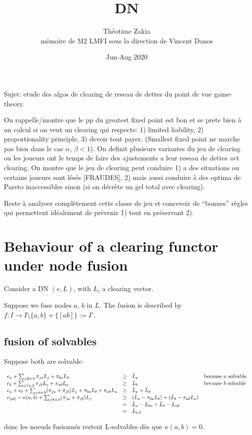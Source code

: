 \documentclass{article}
\title{DN}
\author
{
Théotime Zakia
\\ 
mémoire de M2 LMFI sous la direction de Vincent Danos
}
\date{Jun-Aug 2020}
\def\AR#1{
\[
\begin{array}{llllllll}
#1
\end{array}
\]
}
\begin{document}
\maketitle

Sujet: etude des algos de clearing de reseau de dettes du point de vue game-theory.

On rappelle/montre que le pp du greatest fixed point est bon et se prete bien à un calcul si on veut un clearing qui respecte:
1) limited liability, 
2) proportionality principle, 
3) devoir tout payer. 
(Smallest fixed point ne marche pas bien dans le cas 
$\alpha$, 
$\beta <1$). 
On definit plusieurs variantes du jeu de clearing ou les joueurs ont le temps de faire des ajustements a leur reseau de dettes avt clearing. On montre que le jeu de
clearing peut conduire 1) a des situations ou certains joueurs sont lésés [FRAUDES], 2) mais aussi conduire à des optima de Pareto inaccessibles sinon (si on décrète un gel total avec clearing).

Reste à analyser complètement cette classe de jeu et concevoir de ``bonnes'' règles qui permettent idéalement de prévenir 1) tout en préservant 2). 

\section{
Behaviour of a clearing functor
under node fusion}

Consider a DN $(e,L)$, with $L_i$
a clearing vector.


Suppose we fuse nodes $a$, $b$ in $L$.
The fusion is described by
$f: I \to I\setminus\{a,b\}+\{[ab]\}:=I'$.


\subsection{fusion of solvables} 
Suppose both are solvable:
\AR{
e_a +
\sum_{j\neq a,b} \pi_{ja} L_j
+ \pi_{ba} L_b
&\geq&
\bar L_{a}
&
\hbox{because $a$ solvable}
\\
e_b +
\sum_{j\neq a,b} \pi_{jb} L_j
+ \pi_{ab} L_a
&\geq&
\bar L_{b}
&
\hbox{because $b$ solvable}
\\
e_a + e_b +
\sum_{j\neq a,b} (\pi_{ja}+\pi_{jb}) L_j
+ \pi_{ba} L_b
+ \pi_{ab} L_a
&\geq&
\bar L_{a}
+\bar L_{b}
\\
e_{[ab]} - \kappa(a,b) +
\sum_{j\neq a,b} (\pi_{ja}+\pi_{jb}) L_j
&\geq&
(\bar L_{a} - \pi_{ba} L_b)
+
(\bar L_{b} - \pi_{ab} L_a)
\\
&=&
\bar L_{a} - L_{ba}
+
\bar L_{b} - L_{ab}
\\
&=&
\bar L_{a,b}
}
donc les noeuds fusionnés restent L-solvables
dès que 
$\kappa(a,b)=0$.
\end{document}
